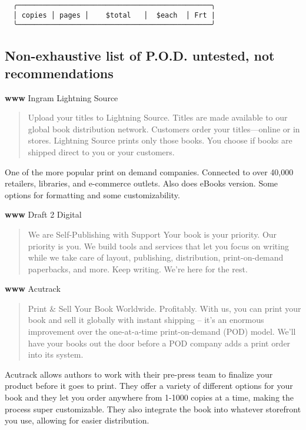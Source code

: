 \documentclass[
]{article}
\begin{document}
\begin{verbatim}
  ╭──────────────────────────────────────────────╮ 
  │ copies │ pages │    $total   │  $each  │ Frt | 
  ╰──────────────────────────────────────────────╯ 
\end{verbatim}

\subsection{Non-exhaustive list of P.O.D. untested, not recommendations}

\textbf{www} Ingram Lightning Source

\begin{quote}
Upload your titles to Lightning Source. Titles are made available to our
global book distribution network. Customers order your titles---online
or in stores. Lightning Source prints only those books. You choose if
books are shipped direct to you or your customers.
\end{quote}

One of the more popular print on demand companies. Connected to over
40,000 retailers, libraries, and e-commerce outlets. Also does eBooks
version. Some options for formatting and some customizability.

\textbf{www} Draft 2 Digital

\begin{quote}
We are Self-Publishing with Support Your book is your priority. Our
priority is you. We build tools and services that let you focus on
writing while we take care of layout, publishing, distribution,
print-on-demand paperbacks, and more. Keep writing. We're here for the
rest.
\end{quote}

\textbf{www} Acutrack

\begin{quote}
Print \& Sell Your Book Worldwide. Profitably. With us, you can print
your book and sell it globally with instant shipping -- it's an enormous
improvement over the one-at-a-time print-on-demand (POD) model. We'll
have your books out the door before a POD company adds a print order
into its system.
\end{quote}

Acutrack allows authors to work with their pre-press team to finalize
your product before it goes to print. They offer a variety of different
options for your book and they let you order anywhere from 1-1000 copies
at a time, making the process super customizable. They also integrate
the book into whatever storefront you use, allowing for easier
distribution.
\end{document}
